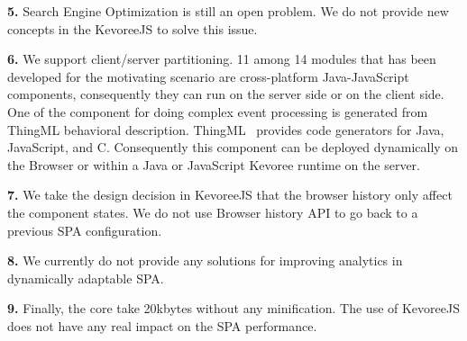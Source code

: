 \indent \textbf{5.} Search Engine Optimization is still an open problem. We do not provide new concepts in the KevoreeJS to solve this issue.    

\indent \textbf{6.} We support client/server partitioning. 11 among 14 modules that has been developed for the motivating scenario are cross-platform Java-JavaScript components, consequently they can run on the server side or on the client side.  One of the component for doing complex event processing is generated from ThingML behavioral description. ThingML~\cite{DBLP:conf/models/FleureyMSB11} provides code generators for Java, JavaScript, and C. Consequently this component can be deployed dynamically on the Browser or within a Java or JavaScript Kevoree runtime on the server.  

\indent \textbf{7.} We take the design decision in KevoreeJS that the browser history only affect the component states. We do not use Browser history API to go back to a previous SPA configuration. 

\indent \textbf{8.} We currently do not provide any solutions for improving analytics in dynamically adaptable SPA.   

\indent \textbf{9.} Finally, the core take 20kbytes without any minification. The use of KevoreeJS does not have any real impact on the SPA performance.


